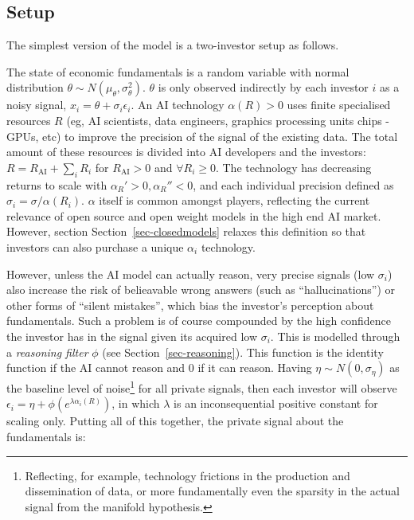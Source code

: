 \documentclass[
]{article}
\theoremstyle{plain}
\theoremstyle{remark}
\begin{document}
\subsection{Setup}\label{setup}

The simplest version of the model is a two-investor setup as follows.

The state of economic fundamentals is a random variable with normal
distribution \(\theta \sim N(\mu_\theta, \sigma_\theta^2)\). \(\theta\)
is only observed indirectly by each investor \(i\) as a noisy signal,
\(x_i = \theta + \sigma_i \epsilon_i\). An AI technology
\(\alpha(R) > 0\) uses finite specialised resources \(R\) (eg, AI
scientists, data engineers, graphics processing units chips - GPUs, etc)
to improve the precision of the signal of the existing data. The total
amount of these resources is divided into AI developers and the
investors: \(R = R_{\text{AI}} + \sum_{i} R_i\) for
\(R_{\text{AI}} > 0\) and \(\forall R_i \geq 0\). The technology has
decreasing returns to scale with \(\alpha_R' > 0, \alpha_R'' < 0\), and
each individual precision defined as
\(\sigma_i = \sigma / \alpha(R_i)\). \(\alpha\) itself is common amongst
players, reflecting the current relevance of open source and open weight
models in the high end AI market. However, section
Section~\ref{sec-closedmodels} relaxes this definition so that investors
can also purchase a unique \(\alpha_i\) technology.

However, unless the AI model can actually reason, very precise signals
(low \(\sigma_i\)) also increase the risk of belieavable wrong answers
(such as ``hallucinations'') or other forms of ``silent mistakes'',
which bias the investor's perception about fundamentals. Such a problem
is of course compounded by the high confidence the investor has in the
signal given its acquired low \(\sigma_i\). This is modelled through a
\emph{reasoning filter} \(\phi\) (see Section~\ref{sec-reasoning}). This
function is the identity function if the AI cannot reason and 0 if it
can reason. Having \(\eta \sim N(0, \sigma_\eta)\) as the baseline level
of noise\footnote{Reflecting, for example, technology frictions in the
  production and dissemination of data, or more fundamentally even the
  sparsity in the actual signal from the manifold hypothesis.} for all
private signals, then each investor will observe
\(\epsilon_i = \eta + \phi(e^{\lambda \alpha_i(R)})\), in which
\(\lambda\) is an inconsequential positive constant for scaling only.
Putting all of this together, the private signal about the fundamentals
is:
\end{document}
